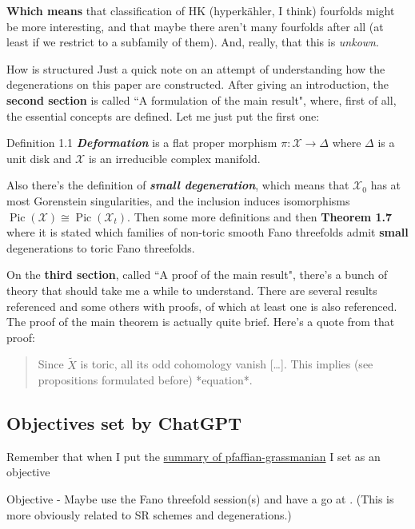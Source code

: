 {\color{5}\bfseries Which means}\hspace{.5em} that classification of HK (hyperkähler, I think) fourfolds might be more interesting, and that maybe there aren't many fourfolds after all (at least if we restrict to a subfamily of them). And, really, that this is \textit{unkown}.
\vspace{2em}


\begin{thing7}{How \cite{galkin1} is structured}\leavevmode
Just a quick note on an attempt of understanding how the degenerations on this paper are constructed. After giving an introduction, the \textbf{second section}  is called ``A formulation of the main result", where, first of all, the essential concepts are defined. Let me just put the first one:
\begin{thing4}{Definition 1.1}\leavevmode
\textit{\textbf{Deformation}} is a flat proper morphism \(\pi: \mathcal{X}\to \Delta\) where \(\Delta\) is a unit disk and \(\mathcal{X}\) is an irreducible complex manifold.
\end{thing4}
Also there's the definition of \textit{\textbf{small degeneration}}, which means that \(\mathcal{X}_0\) has at most Gorenstein singularities, and the inclusion induces isomorphisms \(\operatorname{Pic}(\mathcal{X}) \cong \operatorname{Pic}(\mathcal{X}_t)\).  Then some more definitions and then  \textbf{Theorem 1.7} where it is stated which families of non-toric smooth Fano threefolds admit \textbf{small} degenerations to toric Fano threefolds.

On the \textbf{third section}, called ``A proof of the main result", there's a bunch of theory that should take me a while to understand. There are several results referenced and some others with proofs, of which at least one is also referenced. The proof of the main theorem is actually quite brief. Here's a quote from that proof:
\begin{quotation}
	Since \(\tilde{X}\) is toric, all its odd cohomology vanish […]. This implies (see propositions formulated before) *equation*.
\end{quotation}

\end{thing7}

\subsection{Objectives set by ChatGPT}

Remember that when I put the \hyperref[summary-pfgr]{summary of pfaffian-grassmanian} I set as an objective
\begin{thing5}{Objective} - Maybe use the Fano threefold session(s) and have a go at \cite{jan4}. (This is more obviously related to SR schemes and degenerations.)
\end{thing5}

